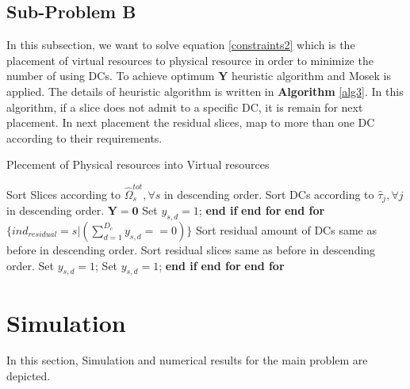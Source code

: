 \documentclass[conference]{IEEEtran}
\begin{document}
\subsection{Sub-Problem B}
In this subsection, we want to solve equation \eqref{constraints2} which is the placement of virtual resources to physical resource in order to minimize the number of using DCs. 
To achieve optimum $\boldsymbol{Y}$ heuristic algorithm and Mosek is applied. The details of heuristic algorithm is written in \textbf{Algorithm} \eqref{alg3}. In this algorithm, if a slice does not admit to a specific DC, it is remain for next placement. In next placement the residual slices, map to more than one DC according to their requirements.
\begin{algorithm}
\caption{Plecement of Physical resources into Virtual resources}\label{alg3}
\begin{algorithmic}[1]
\State Sort Slices according to $\hat{\Omega}_{s}^{tot} , \forall s$ in descending order.
\State Sort DCs according to $\hat{\tau}_j , \forall j$ in descending order. 
\State $\boldsymbol{Y} = \boldsymbol{0}$
\State Set $y_{s,d} = 1$;
\EndIf 
\State \textbf{end if}
\EndFor 
\State \textbf{end for}
\EndFor 
\State \textbf{end for}
\State  $\{ind_{residual} = s|({\sum_{d=1}^{D_c}y_{s,d}==0})\}$
\State Sort residual amount of DCs same as before in descending order.
\State Sort residual slices same as before in descending order.
\State Set $y_{s,d} = 1$;
\State Set $y_{s,d} = 1$;
\EndIf 
\State \textbf{end if}
\EndFor 
\State \textbf{end for}
\EndFor 
\State \textbf{end for}
\end{algorithmic}
\end{algorithm}
\section{Simulation}
In this section, Simulation and numerical results for the main problem are depicted.


\end{document}
